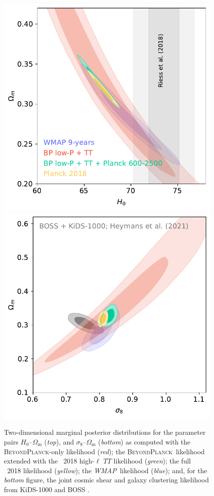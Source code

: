 \documentclass[twocolumn]{aa}
\def\WMAP{\textit{WMAP}}
\newcommand{\BP}{\textsc{BeyondPlanck}}
\begin{document}
\begin{figure}[ht]
	\center
	\includegraphics[width=\linewidth]{figs/BP10_ext_H0_OmM.pdf} \\
	\includegraphics[width=\linewidth]{figs/BP10_ext_s8_OmM.pdf}
	\caption{Two-dimensional marginal posterior distributions for the parameter pairs 
	$H_0$--$\Omega_{\mathrm m}$ (\emph{top}), and $\sigma_8$--$\Omega_{\mathrm m}$ (\emph{bottom}) 
	as computed with the \BP-only likelihood (\emph{red}); the
        \BP\ likelihood extended with the \Planck\ 2018 high-$\ell$
        $TT$ likelihood (\emph{green}); the full \Planck\ 2018 likelihood 
	(\emph{yellow}); the \WMAP\ likelihood (\emph{blue}); and, for the 
	\emph{bottom} figure, the joint cosmic shear and galaxy clustering
	likelihood from KiDS-1000 and BOSS \citep[][\emph{gray}]{KiDS2021}.}
	\label{fig:s8_omb}
\end{figure}
\end{document}
